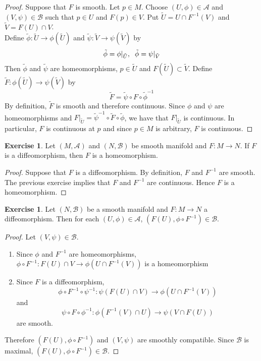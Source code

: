 \documentclass{book}
\theoremstyle{definition}
\newtheorem{ex}[definition]{Exercise}
\newcommand{\MA}{\mathcal{A}}
\newcommand{\MB}{\mathcal{B}}
\newcommand{\tU}{\tilde{U}}
\newcommand{\tV}{\tilde{V}}
\newcommand{\tphi}{\tilde{\phi}}
\newcommand{\tpsi}{\tilde{\psi}}
\newcommand{\tF}{\tilde{F}}
\DeclareMathOperator*{\0}{\mbf{0}}
\DeclareMathOperator*{\1}{\mbf{1}}
\begin{document}
	\begin{proof}
	Suppose that $F$ is smooth. Let $p \in M$. Choose $(U, \phi) \in \MA$ and $(V, \psi) \in \MB$ such that $p \in U$ and $F(p) \in V$. Put $\tU = U \cap F^{-1}(V)$ and $\tV = F(U) \cap V$. \\
	Define $\tphi: \tU \rightarrow \phi(\tU)$ and $\tpsi: \tV \rightarrow \psi(\tV)$ by $$\tphi = \phi|_{\tU}, \hspace{.2cm} \tphi = \psi|_{\tV}$$ Then $\tphi$ and $\tpsi$ are homeomorphisms, $p \in \tU$ and $F(\tU) \subset \tV$. Define $\tF: \phi(\tU) \rightarrow \psi(\tV) $ by $$ \tF = \tpsi \circ F \circ \tphi^{-1}$$  
	By definition, $\tF$ is smooth and therefore continuous. Since $\phi$ and $\psi$ are homeomorphisms and $F|_{\tU} = \tpsi^{-1} \circ \tF \circ \tphi$, we have that $F|_{\tU}$ is continuous. In particular, $F$ is continuous at $p$ and since $p \in M$ is arbitrary, $F$ is continuous.
	\end{proof}
	
	\begin{ex}
	Let $(M, \MA)$ and $(N, \MB)$ be smooth manifold and $F: M \rightarrow N$. If $F$ is a diffeomorphism, then $F$ is a homeomorphism. 
	\end{ex}	
	
	\begin{proof}
	Suppose that $F$ is a diffeomorphism. By definition, $F$ and  $F^{-1}$ are smooth. The previous exercise implies that $F$ and $F^{-1}$ are continuous. Hence $F$  is a homeomorphism. 
	\end{proof}
	
	\begin{ex}
		Let $(N, \MB)$ be a smooth manifold and $F: M \rightarrow N$ a diffeomorphism. Then for each $(U, \phi) \in \MA$, $(F(U), \phi \circ F^{-1}) \in \MB$.
	\end{ex}
	
	\begin{proof}
		Let $(V, \psi) \in \MB$. 
		\begin{enumerate}
		\item Since $\phi$ and $F^{-1}$ are homeomorphisms, $\phi \circ F^{-1}: F(U) \cap V \rightarrow \phi(U \cap F^{-1}(V))$ is a homeomorphism
		\item Since $F$ is a diffeomorphism, $$\phi \circ F^{-1} \circ \psi^{-1}: \psi(F(U) \cap V) \rightarrow \phi(U \cap F^{-1}(V))$$ and $$\psi \circ F \circ \phi^{-1}: \phi(F^{-1}(V) \cap U) \rightarrow \psi(V \cap F(U))$$ are smooth. 
		\end{enumerate}
		
		Therefore $(F(U), \phi \circ F^{-1})$ and $(V, \psi)$ are smoothly compatible. Since $\MB$ is maximal, $(F(U), \phi \circ F^{-1}) \in \MB$.
	\end{proof}
\end{document}
